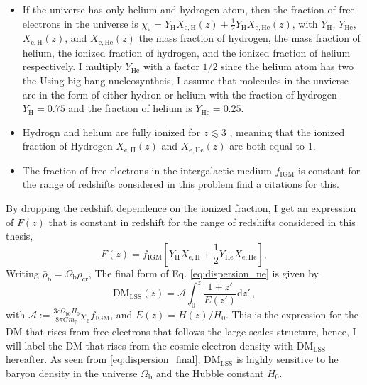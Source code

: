 \begin{itemize}
    \item If the universe has only helium and hydrogen atom, then the fraction of free electrons in the universe is $\chi_\mathrm{e} = Y_{\mathrm{H}}X_{\mathrm{e, H}}(z) + \frac{1}{2}Y_{\mathrm{H}} X_{\mathrm{e, He}}(z)$, with $Y_{\mathrm{H}}$,  $Y_{\mathrm{He}}$, $X_{\mathrm{e, H}}(z)$, and $X_{\mathrm{e, He}}(z)$ the mass fraction of hydrogen, the mass fraction of helium, the ionized fraction of hydrogen, and the ionized fraction of helium respectively. I multiply $Y_{\mathrm{He}}$ with a factor $1/2$ since the helium atom has two the Using big bang nucleosyntheis, I assume that molecules in the unvierse are in the form of either hydron or helium with the fraction of hydrogen $Y_{\mathrm{H}} = 0.75$ and the fraction of helium is $Y_{\mathrm{He}} = 0.25$.
    
    \item Hydrogn and helium are fully ionized for $z \lesssim 3$ \citep{RevModPhys.81.1405}, meaning that the ionized fraction of Hydrogen $X_{\mathrm{e, H}}(z)$ and $X_{\mathrm{e, He}}(z)$ are both equal to 1.
    
    \item The fraction of free electrons in the intergalactic medium $f_{\mathrm{IGM}}$ is constant for the range of redshifts considered in this problem{\color{red} find a citations for this}.
\end{itemize}
By dropping the redshift dependence on the ionized fraction, I get an expression of $F(z)$ that is constant in redshift for the range of redshifts considered in this thesis,
\begin{equation}
    F(z) = f_{\mathrm{IGM}}\left[Y_{\mathrm{H}}X_{\mathrm{e, H}} + \frac{1}{2}Y_{\mathrm{He}} X_{\mathrm{e, He}}\right],
\end{equation}
Writing $\bar{\rho}_\mathrm{b} = \Omega_\mathrm{b} \rho_{\mathrm{cr}}$, The final form of Eq. \ref{eq:dispersion_ne} is given by
\begin{equation} \label{eq:dispersion_final}
    \mathrm{DM}_\mathrm{LSS}(z) = \mathcal{A} \int_0^z \frac{1+z'}{E(z')} \mathrm{d}z' \, ,
\end{equation}
with $\mathcal{A} := \frac{3c\Omega_{\mathrm{b0}}H_0}{8\pi G m_{\mathrm{p}}} \chi_{\mathrm{e}} f_{\mathrm{IGM}}$, and $E(z) = H(z)/H_0$. This is the expression for the DM that rises from free electrons that follows the large scales structure, hence, I will label the DM that rises from the cosmic electron density with $\mathrm{DM}_\mathrm{LSS}$ hereafter. As seen from \ref{eq:dispersion_final},  $\mathrm{DM}_\mathrm{LSS}$ is highly sensitive to he baryon density in the universe $\Omega_\mathrm{b}$ and the Hubble constant $H_0$. 

